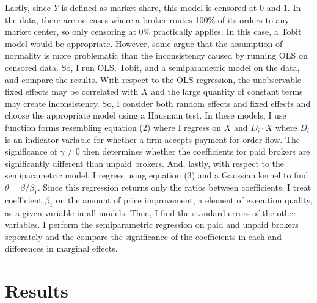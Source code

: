 \documentclass[11pt,a4paper]{article}
\begin{document}
	Lastly, since $Y$  is defined as market share, this model is censored at 0 and 1. In the data, there are no cases where a broker routes 100\% of its orders to any market center, so only censoring at 0\% practically applies. In this case, a Tobit model would be appropriate. However, some argue that the assumption of normality is more problematic than the inconsistency caused by running OLS on censored data. So, I run OLS, Tobit, and a semiparametric model on the data, and compare the results. With respect to the OLS regression, the unobservable fixed effects may be correlated with $X$ and the large quantity of constant terms may create inconsistency. So, I consider both random effects and fixed effects and choose the appropriate model using a Hausman test. In these models, I use function forms resembling equation (2) where I regress on $X$ and $D_i \cdot X$ where $D_i$ is an indicator variable for whether a firm accepts payment for order flow. The significance of $\gamma \neq 0$ then determines whether the coefficients for paid brokers are significantly different than unpaid brokers. And, lastly, with respect to the semiparametric model, I regress using equation (3) and a Gaussian kernel to find $\theta = \beta / \beta_1$. Since this regression returns only the ratios between coefficients, I treat coefficient $\beta_1$ on the amount of price improvement, a element of execution quality, as a given variable in all models. Then, I find the standard errors of the other variables. I perform the semiparametric regression on paid and unpaid brokers seperately and the compare the significance of the coefficients in each and differences in marginal effects. 
	
	


\pagebreak	
\section{Results}

\vspace{5em}
	
\end{document}
